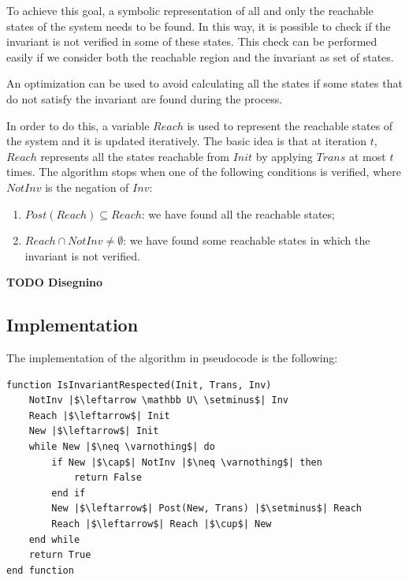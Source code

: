 \documentclass[12pt]{article}
\begin{document}
    To achieve this goal, a symbolic representation of all and only the reachable states of the system needs to be found.
    In this way, it is possible to check if the invariant is not verified in some of these states.
    This check can be performed easily if we consider both the reachable region and the invariant as set of states.

    An optimization can be used to avoid calculating all the states if some states that do not satisfy the invariant are found during the process.

    In order to do this, a variable $Reach$ is used to represent the reachable states of the system and it is updated iteratively.
    The basic idea is that at iteration $t$, $Reach$ represents all the states reachable from $Init$ by applying $Trans$ at most $t$ times.
    The algorithm stops when one of the following conditions is verified, where $NotInv$ is the negation of $Inv$:
    \begin{enumerate}
        \item $Post(Reach) \subseteq Reach $: we have found all the reachable states;
        \item $Reach \cap NotInv \neq \emptyset$: we have found some reachable states in which the invariant is not verified.
    \end{enumerate}

    \textbf{TODO Disegnino}

    \subsection{Implementation}
    The implementation of the algorithm in pseudocode is the following:

    \begin{verbatim}
function IsInvariantRespected(Init, Trans, Inv)
    NotInv |$\leftarrow \mathbb U\ \setminus$| Inv
    Reach |$\leftarrow$| Init
    New |$\leftarrow$| Init
    while New |$\neq \varnothing$| do
        if New |$\cap$| NotInv |$\neq \varnothing$| then
            return False
        end if
        New |$\leftarrow$| Post(New, Trans) |$\setminus$| Reach
        Reach |$\leftarrow$| Reach |$\cup$| New
    end while
    return True
end function
    \end{verbatim}
\end{document}
